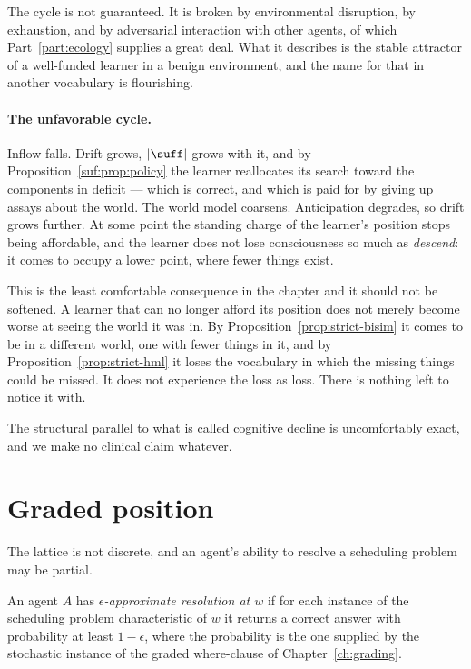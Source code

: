\begin{remark}
The cycle is not guaranteed.
It is broken by environmental disruption, by exhaustion, and by
adversarial interaction with other agents, of which
Part~\ref{part:ecology} supplies a great deal.
What it describes is the stable attractor of a well-funded learner in a
benign environment, and the name for that in another vocabulary is
flourishing.
\end{remark}

\paragraph{The unfavorable cycle.}
Inflow falls.
Drift grows, $|\suff|$ grows with it, and by
Proposition~\ref{suf:prop:policy} the learner reallocates its search
toward the components in deficit --- which is correct, and which is
paid for by giving up assays about the world.
The world model coarsens.
Anticipation degrades, so drift grows further.
At some point the standing charge of the learner's position stops being
affordable, and the learner does not lose consciousness so much as
\emph{descend}: it comes to occupy a lower point, where fewer things
exist.

\begin{remark}
\label{rmk:descent}
This is the least comfortable consequence in the chapter and it should
not be softened.
A learner that can no longer afford its position does not merely become
worse at seeing the world it was in.
By Proposition~\ref{prop:strict-bisim} it comes to be in a different
world, one with fewer things in it, and by
Proposition~\ref{prop:strict-hml} it loses the vocabulary in which the
missing things could be missed.
It does not experience the loss as loss.
There is nothing left to notice it with.

The structural parallel to what is called cognitive decline is
uncomfortably exact, and we make no clinical claim whatever.
\end{remark}

\section{Graded position}

The lattice is not discrete, and an agent's ability to resolve a
scheduling problem may be partial.

\begin{definition}
\label{def:approx}
An agent $A$ has \emph{$\epsilon$-approximate resolution at $w$} if for
each instance of the scheduling problem characteristic of $w$ it returns
a correct answer with probability at least $1-\epsilon$, where the
probability is the one supplied by the stochastic instance of the graded
where-clause of Chapter~\ref{ch:grading}.
\end{definition}


